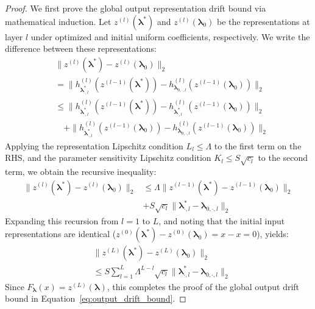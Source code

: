 \begin{proof}
We first prove the global output representation drift bound via mathematical induction. Let $z^{(l)}(\boldsymbol{\lambda}^*)$ and $z^{(l)}(\boldsymbol{\lambda}_0)$ be the representations at layer $l$ under optimized and initial uniform coefficients, respectively. We write the difference between these representations:
\begin{align}
\label{eq:induction_step}
&\|z^{(l)}(\boldsymbol{\lambda}^*) - z^{(l)}(\boldsymbol{\lambda}_0)\|_2 \nonumber \\
&= \|h^{(l)}_{\boldsymbol{\lambda}^*_{\cdot, l}}(z^{(l-1)}(\boldsymbol{\lambda}^*)) - h^{(l)}_{\boldsymbol{\lambda}_{0, \cdot, l}}(z^{(l-1)}(\boldsymbol{\lambda}_0))\|_2 \nonumber \\
&\le \|h^{(l)}_{\boldsymbol{\lambda}^*_{\cdot, l}}(z^{(l-1)}(\boldsymbol{\lambda}^*)) - h^{(l)}_{\boldsymbol{\lambda}^*_{\cdot, l}}(z^{(l-1)}(\boldsymbol{\lambda}_0))\|_2 \nonumber \\
&\quad + \|h^{(l)}_{\boldsymbol{\lambda}^*_{\cdot, l}}(z^{(l-1)}(\boldsymbol{\lambda}_0)) - h^{(l)}_{\boldsymbol{\lambda}_{0, \cdot, l}}(z^{(l-1)}(\boldsymbol{\lambda}_0))\|_2
\end{align}
Applying the representation Lipschitz condition $L_l \le \Lambda$ to the first term on the RHS, and the parameter sensitivity Lipschitz condition $K_l \le S \sqrt{c_l}$ to the second term, we obtain the recursive inequality:
\begin{align}
\|z^{(l)}(\boldsymbol{\lambda}^*) - z^{(l)}(\boldsymbol{\lambda}_0)\|_2 &\le \Lambda \|z^{(l-1)}(\boldsymbol{\lambda}^*) - z^{(l-1)}(\boldsymbol{\lambda}_0)\|_2 \nonumber \\
&+ S \sqrt{c_l} \|\boldsymbol{\lambda}^*_{\cdot, l} - \boldsymbol{\lambda}_{0, \cdot, l}\|_2
\end{align}
Expanding this recursion from $l=1$ to $L$, and noting that the initial input representations are identical ($z^{(0)}(\boldsymbol{\lambda}^*) - z^{(0)}(\boldsymbol{\lambda}_0) = x - x = 0$), yields:
\begin{align}
&\|z^{(L)}(\boldsymbol{\lambda}^*) - z^{(L)}(\boldsymbol{\lambda}_0)\|_2 \nonumber \\
&\le S \sum_{l=1}^L \Lambda^{L-l} \sqrt{c_l} \|\boldsymbol{\lambda}^*_{\cdot, l} - \boldsymbol{\lambda}_{0, \cdot, l}\|_2
\end{align}
Since $F_{\boldsymbol{\lambda}}(x) = z^{(L)}(\boldsymbol{\lambda})$, this completes the proof of the global output drift bound in Equation~\ref{eq:output_drift_bound}. 


\end{proof}
